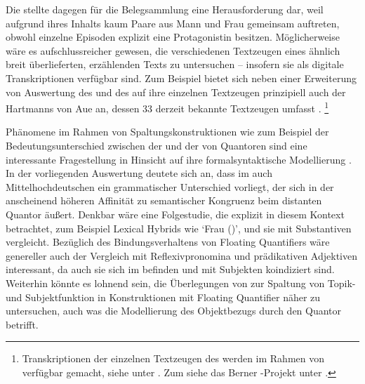 Die \KC{} stellte dagegen für die Belegsammlung eine Herausforderung dar, weil
aufgrund ihres Inhalts kaum Paare aus Mann und Frau gemeinsam auftreten, obwohl
einzelne Episoden explizit eine Protagonistin besitzen. Möglicherweise wäre es
aufschlussreicher gewesen, die verschiedenen Textzeugen eines ähnlich breit
überlieferten, erzählenden Texts zu untersuchen -- insofern sie als digitale
Transkriptionen verfügbar sind. Zum Beispiel bietet sich
neben einer Erweiterung von  Auswertung des
 und des  auf ihre einzelnen Textzeugen prinzipiell
auch der  Hartmanns von Aue an, dessen  33
derzeit bekannte Textzeugen umfasst \autocites[vgl.][s.\,v.~\textit{Hartmann
von Aue: }]{hsc}.%
%
	\footnote{Transkriptionen der einzelnen Textzeugen des
		 werden im Rahmen von  verfügbar
		gemacht, siehe unter . Zum  siehe das
		Berner -Projekt unter .%
	}

Phänomene im Rahmen von Spaltungskonstruktionen wie zum Beispiel der
Bedeutungs\-unterschied zwischen der  und der
 von Quantoren sind eine interessante Fragestellung in
Hinsicht auf ihre formal\-syntaktische Modellierung \autocite[siehe
z.\,B.][]{pittner1995,merchant1996,fanselowcavar2002,nolda2007,shen2019}. In
der vorliegenden Auswertung deutete sich an, dass im auch
Mittelhochdeutschen ein grammatischer Unterschied
vorliegt, der sich in der anscheinend höheren Affinität zu semantischer
Kongruenz beim distanten Quantor äußert. Denkbar wäre eine Folgestudie, die
explizit   in diesem Kontext
betrachtet, zum Beispiel Lexical Hybrids wie 
`Frau (\NeutF)', und sie mit  Substantiven
vergleicht. Bezüglich des Bindungsverhaltens von Floating
Quantifiers wäre genereller auch der Vergleich mit
Reflexivpronomina und prädikativen
Adjektiven interessant, da auch sie sich im
 befinden und mit Subjekten koindiziert sind.
Weiterhin könnte es lohnend sein, die Überlegungen von \citet{spector2009} zur
Spaltung von Topik- und Subjektfunktion in Konstruktionen mit
Floating Quantifier näher zu untersuchen, auch was die Modellierung des
Objektbezugs durch den Quantor betrifft.

